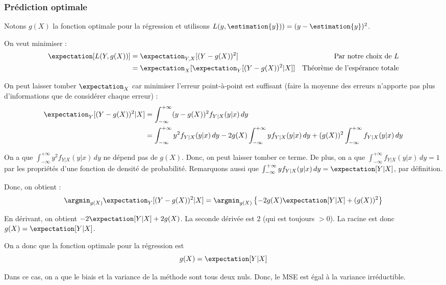     \subsubsection{Prédiction optimale}
        Notons \(g(X)\) la fonction optimale pour la régression et utilisons \(L(y, \estimation{y})) = (y - \estimation{y})^2\).

        On veut minimiser :
        \begin{align*}
            \expectation[L(Y, g(X))] &= \expectation_{Y, X}[(Y - g(X))^2] & \text{Par notre choix de } L\\
            &= \expectation_X[\expectation_Y[(Y - g(X))^2|X]] & \text{Théorème de l'espérance totale}
        \end{align*}

        On peut laisser tomber \(\expectation_X\) car minimiser l'erreur point-à-point est suffisant (faire la moyenne des erreurs n'apporte pas plus d'informations que de considérer chaque erreur) :
        \begin{align*}
            \expectation_Y[(Y - g(X))^2|X] &= \int_{-\infty}^{+\infty} (y - g(X))^2 f_{Y|X}(y|x)\,dy\\
            &= \int_{-\infty}^{+\infty} y^2 f_{Y|X}(y|x)\,dy - 2g(X) \int_{-\infty}^{+\infty} y f_{Y|X}(y|x)\,dy + (g(X))^2 \int_{-\infty}^{+\infty} f_{Y|X}(y|x)\,dy \\
        \end{align*}

        On a que \(\int_{-\infty}^{+\infty} y^2 f_{Y|X}(y|x)\, dy\) ne dépend pas de \(g(X)\). Donc, on peut laisser tomber ce terme. De plus, on a que \(\int_{-\infty}^{+\infty} f_{Y|X}(y|x)\,dy = 1\) par les propriétés d'une fonction de densité de probabilité. Remarquons aussi que \(\int_{-\infty}^{+\infty} y f_{Y|X}(y|x)\, dy = \expectation[Y|X]\), par définition.

        Donc, on obtient :
        \[
            \argmin_{g(X)} \expectation_Y[(Y - g(X))^2|X] = \argmin_{g(X)}\left\{-2g(X) \expectation[Y|X] + (g(X))^2\right\}
        \]

        En dérivant, on obtient \(-2\expectation[Y|X] + 2g(X)\). La seconde dérivée est \(2\) (qui est toujours \(> 0\)). La racine est donc \(g(X) = \expectation[Y|X]\).

        On a donc que la fonction optimale pour la régression est
        \[
            g(X) = \expectation[Y|X]
        \]

        Dans ce cas, on a que le biais et la variance de la méthode sont tous deux nuls. Donc, le MSE est égal à la variance irréductible.

